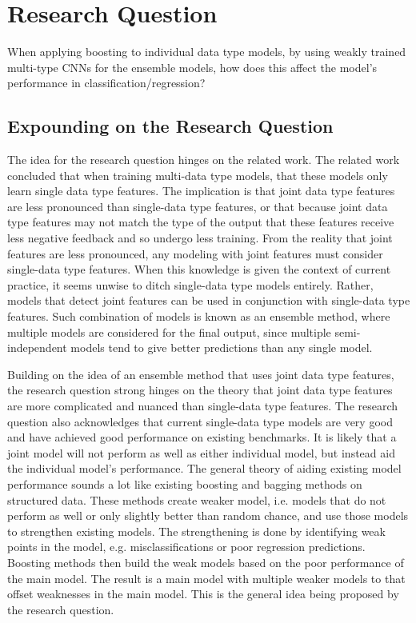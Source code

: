 \section{Research Question}



When applying boosting to individual data type models, by using weakly trained multi-type CNNs for the ensemble models, how does this affect the model's performance in classification/regression?

\subsection{Expounding on the Research Question}
The idea for the research question hinges on the related work.  The related work concluded that when training multi-data type models, that these models only learn single data type features.  The implication is that joint data type features are less pronounced than single-data type features, or that because joint data type features may not match the type of the output that these features receive less negative feedback and so undergo less training.  From the reality that joint features are less pronounced, any modeling with joint features must consider single-data type features.  When this knowledge is given the context of current practice, it seems unwise to ditch single-data type models entirely.  Rather, models that detect joint features can be used in conjunction with single-data type features.  Such combination of models is known as an ensemble method, where multiple models are considered for the final output, since multiple semi-independent models tend to give better predictions than any single model.

Building on the idea of an ensemble method that uses joint data type features, the research question strong hinges on the theory that joint data type features are more complicated and nuanced than single-data type features.  The research question also acknowledges that current single-data type models are very good and have achieved good performance on existing benchmarks. It is likely that a joint model will not perform as well as either individual model, but instead aid the individual model's performance.  The general theory of aiding existing model performance sounds a lot like existing boosting and bagging methods on structured data.  These methods create weaker model, i.e. models that do not perform as well or only slightly better than random chance, and use those models to strengthen existing models.  The strengthening is done by identifying weak points in the model, e.g. misclassifications or poor regression predictions.  Boosting methods then build the weak models based on the poor performance of the main model.  The result is a main model with multiple weaker models to that offset weaknesses in the main model.  This is the general idea being proposed by the research question.

